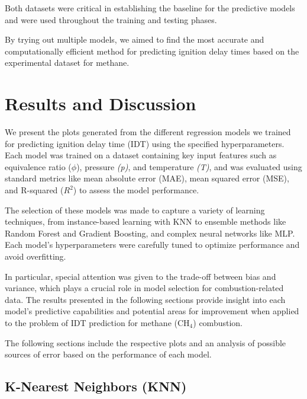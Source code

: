 \documentclass[12pt]{report}
\begin{document}
Both datasets were critical in establishing the baseline for the predictive models and were used throughout the training and testing phases.


By trying out multiple models, we aimed to find the most accurate and computationally efficient method for predicting ignition delay times based on the experimental dataset for methane.

 


\chapter{Results and Discussion}
We present the plots generated from the different regression models we trained for predicting ignition delay time (IDT) using the specified hyperparameters. Each model was trained on a dataset containing key input features such as equivalence ratio (\(\phi\)), pressure \textit{(p)}, and temperature \textit{(T)}, and was evaluated using standard metrics like mean absolute error (MAE), mean squared error (MSE), and R-squared (\(R^2\)) to assess the model performance.

The selection of these models was made to capture a variety of learning techniques, from instance-based learning with KNN to ensemble methods like Random Forest and Gradient Boosting, and complex neural networks like MLP. Each model’s hyperparameters were carefully tuned to optimize performance and avoid overfitting.

In particular, special attention was given to the trade-off between bias and variance, which plays a crucial role in model selection for combustion-related data. The results presented in the following sections provide insight into each model’s predictive capabilities and potential areas for improvement when applied to the problem of IDT prediction for methane (CH\(_4\)) combustion.

The following sections include the respective plots and an analysis of possible sources of error based on the performance of each model.




\section{K-Nearest Neighbors (KNN)}
\end{document}
